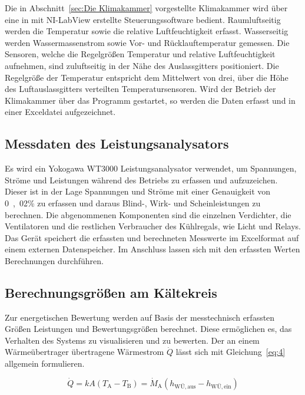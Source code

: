 Die in Abschnitt~\ref{sec:Die Klimakammer} vorgestellte Klimakammer wird über eine in mit NI-LabView erstellte Steuerungssoftware bedient. Raumluftseitig werden die Temperatur sowie die relative Luftfeuchtigkeit erfasst. Wasserseitig werden Wassermassenstrom sowie Vor- und Rücklauftemperatur gemessen. 
Die Sensoren, welche die Regelgrößen Temperatur und relative Luftfeuchtigkeit aufnehmen, sind zuluftseitig in der Nähe des Auslassgitters positioniert. Die Regelgröße der Temperatur entspricht dem Mittelwert von drei, über die Höhe des Luftauslassgitters verteilten Temperatursensoren. Wird der Betrieb der Klimakammer über das Programm gestartet, so werden die Daten erfasst und in einer Exceldatei aufgezeichnet.



\subsection{Messdaten des Leistungsanalysators}
\label{subsec:Messdaten des Leistungsanalysators}

Es wird ein Yokogawa WT3000 Leistungsanalysator verwendet, um Spannungen, Ströme und Leistungen während des Betriebs zu erfassen und aufzuzeichen. Dieser ist in der Lage Spannungen und Ströme mit einer Genauigkeit von \unit{0,02}{\%} zu erfassen und daraus Blind-, Wirk- und Scheinleistungen zu berechnen. Die abgenommenen Komponenten sind die einzelnen Verdichter, die Ventilatoren und die restlichen Verbraucher des Kühlregals, wie Licht und Relays. Das Gerät speichert die erfassten und berechneten Messwerte im Excelformat auf einem externen Datenspeicher. \newline
Im Anschluss lassen sich mit den erfassten Werten Berechnungen durchführen.


\subsection{Berechnungsgrößen am Kältekreis}
\label{subsec:Berechnungsgrössen}

Zur energetischen Bewertung werden auf Basis der messtechnisch erfassten Größen Leistungen und Bewertungsgrößen berechnet. Diese ermöglichen es, das Verhalten des Systems zu visualisieren und zu bewerten.
Der an einem Wärmeübertrager übertragene Wärmestrom  $\dot{Q}$ lässt sich mit Gleichung~\ref{eq:4} allgemein formulieren.

\begin{equation}
\label{eq:4}
\dot{Q}= kA(T_\mathrm{A} - T_\mathrm{B}) = \dot{M}_{\mathrm{A}}(h_{\mathrm{WÜ,aus}} - h_{\mathrm{WÜ,ein}})
\end{equation}


